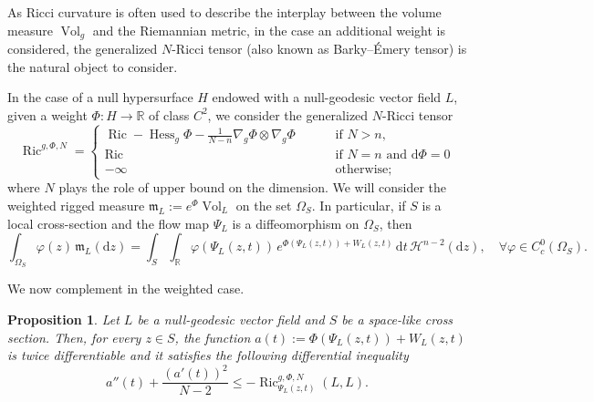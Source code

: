 \documentclass[12pt,a4paper]{amsart}
\theoremstyle{plain}
\newtheorem{proposition}[lemma]{Proposition}
\theoremstyle{definition}
\numberwithin{equation}{section}
\let\phi\varphi
\newcommand{\R}{\mathbb{R}}
\DeclareMathOperator{\Hess}{Hess}
\DeclareMathOperator{\Ric}{Ric}
\DeclareMathOperator{\vol}{Vol}
\newcommand{\de}{{\mathrm{d}}}
\newcommand{\haus}{\mathcal{H}}
\newcommand{\gflow}{\Psi}
\newcommand{\mm}{\mathfrak m}
\begin{document}
As Ricci curvature is often used to 
describe the interplay between the volume measure $\vol_g$
 and the Riemannian metric, 
in the case an additional weight is considered, 
the generalized $N$-Ricci tensor (also known as Barky--\'Emery tensor)
is the natural object to consider. 

In the case of a null hypersurface $H$
endowed with a null-geodesic vector field $L$, given a weight $\Phi: H \to \R$ of class $C^2$, we consider 
the generalized $N$-Ricci tensor 
\begin{equation}
  \Ric^{g,\Phi,N}
  =
  \begin{cases}
  \Ric
  -
  \Hess_g\Phi
  -
  \frac{1}{ N-n}
  \nabla_g\Phi
  \otimes
  \nabla_g\Phi
      \qquad
    &
      \text{ if }N>n,
    \\
    \Ric
      \qquad
    &
      \text{ if $N=n$ and }
      \de \Phi=0
    \\
    -\infty
    &
      \text{ otherwise;}
  \end{cases}
\end{equation}
where $N$ plays the role of upper bound on the dimension.
%
We will consider the weighted rigged measure
$\mm_L:=e^{\Phi}\vol_L$  on the set  $\Omega_{S}$.
In particular, if $S$ is a local 
cross-section and the flow map $\gflow_{L}$ is a diffeomorphism on $\Omega_{S}$, then
 \begin{equation}\label{E:formulamL}
    \int_{\Omega_S}
    \phi(z)
    \,
    \mm_L
    (\de z)
    =
    \int_S
    \int_{\R}
    \phi(\gflow_L(z,t))
    \,
    e^{\Phi(\gflow_L(z,t))+W_{L}(z,t)}
    \,
    \de t
    \,
    \haus^{n-2}(\de z)
    ,
    \quad
    \forall
    \phi
    \in
    C^{0}_c(\Omega_S)
    .
  \end{equation}


We now complement  in the weighted case.



\begin{proposition}
  \label{P:convexity-weight}
  Let $L$ be a null-geodesic vector field and $S$ be a space-like cross
  section.
Then, for every $z\in S$, the function $a(t):=\Phi(\gflow_L(z,t))+W_{L}(z,t)$ is twice differentiable and it satisfies the
  following differential inequality
  \begin{equation}
    a''(t)
    +\frac{(a'(t))^2}{N-2}
    \leq
    -\Ric^{g,\Phi,N}_{\gflow_{L}(z,t)}(L,L)
    .
  \end{equation}
\end{proposition}
\end{document}
